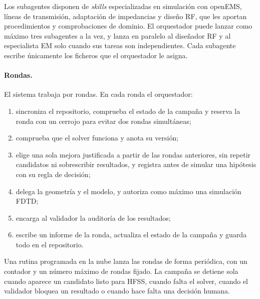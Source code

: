 \documentclass[11pt,a4paper]{article}
\begin{document}
Los subagentes disponen de \textit{skills} especializadas en simulación con openEMS, líneas de
transmisión, adaptación de impedancias y diseño RF, que les aportan procedimientos y
comprobaciones de dominio. El orquestador puede lanzar como máximo tres subagentes a la vez, y
lanza en paralelo al diseñador RF y al especialista EM solo cuando sus tareas son independientes.
Cada subagente escribe únicamente los ficheros que el orquestador le asigna.

\paragraph{Rondas.} El sistema trabaja por rondas. En cada ronda el orquestador:
\begin{enumerate}
    \item sincroniza el repositorio, comprueba el estado de la campaña y reserva la ronda con un
    cerrojo para evitar dos rondas simultáneas;
    \item comprueba que el solver funciona y anota su versión;
    \item elige una sola mejora justificada a partir de las rondas anteriores, sin repetir
    candidatos ni sobrescribir resultados, y registra antes de simular una hipótesis con su
    regla de decisión;
    \item delega la geometría y el modelo, y autoriza como máximo una simulación FDTD;
    \item encarga al validador la auditoría de los resultados;
    \item escribe un informe de la ronda, actualiza el estado de la campaña y guarda todo en el
    repositorio.
\end{enumerate}
Una rutina programada en la nube lanza las rondas de forma periódica, con un contador y un número
máximo de rondas fijado. La campaña se detiene sola cuando aparece un candidato
listo para HFSS, cuando falta el solver, cuando el validador bloquea un resultado o cuando hace
falta una decisión humana.
\end{document}
